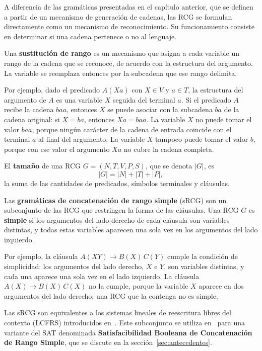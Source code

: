 A diferencia de las gramáticas presentadas en el capítulo anterior, que
se definen a partir de un mecanismo de generación de cadenas, las RCG
se formulan directamente como un mecanismo de reconocimiento. Su
funcionamiento consiste en determinar si una cadena pertenece o no al
lenguaje.

\begin{definicion}
Una \textbf{sustitución de rango} es un mecanismo que asigna a cada
variable un rango de la cadena que se reconoce, de acuerdo con la
estructura del argumento. La variable se reemplaza entonces por la
subcadena que ese rango delimita.
\end{definicion}

Por ejemplo, dado el predicado $A(Xa)$ con $X \in V$ y $a \in T$, la
estructura del argumento de $A$ es una variable $X$ seguida del
terminal $a$. Si el predicado $A$ recibe la cadena $baa$, entonces $X$
se puede asociar con la subcadena $ba$ de la cadena original: si
$X = ba$, entonces $Xa = baa$. La variable $X$ no puede tomar el valor
$baa$, porque ningún carácter de la cadena de entrada coincide con el
terminal $a$ al final del argumento. La variable $X$ tampoco puede
tomar el valor $b$, porque con ese valor el argumento $Xa$ no cubre la
cadena completa.

\begin{definicion}
\label{def:tamano-rcg}
El \textbf{tamaño} de una RCG $G = (N, T, V, P, S)$, que se denota $|G|$, es
\[
  |G| = |N| + |T| + |P|,
\]
la suma de las cantidades de predicados, símbolos terminales y cláusulas.
\end{definicion}

\begin{definicion}
Las \textbf{gramáticas de concatenación de rango simple} (sRCG) son un
subconjunto de las RCG que restringen la forma de las cláusulas. Una
RCG $G$ es \textbf{simple} si los argumentos del lado derecho de cada
cláusula son variables distintas, y todas estas variables aparecen una
sola vez en los argumentos del lado izquierdo.
\end{definicion}

Por ejemplo, la cláusula $A(XY) \to B(X)\, C(Y)$ cumple la condición de
simplicidad: los argumentos del lado derecho, $X$ e $Y$, son variables
distintas, y cada una aparece una sola vez en el lado izquierdo. La
cláusula $A(X) \to B(X)\, C(X)$ no la cumple, porque la variable $X$
aparece en dos argumentos del lado derecho; una RCG que la contenga no
es simple.

Las sRCG son equivalentes a los sistemas lineales de reescritura libres
del contexto (LCFRS) introducidos en~\cite{vijayshanker1987lcfrs}. Este
subconjunto se utiliza en~\cite{aguileralopez2016} para una variante
del SAT denominada \textbf{Satisfacibilidad Booleana de Concatenación
de Rango Simple}, que se discute en la sección~\ref{sec:antecedentes}.

